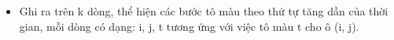 \begin{itemize}
	\item Ghi ra trên k dòng, thể    hiện các bước tô màu theo thứ tự tăng dần của thời    gian, mỗi dòng có dạng: i, j, t tương ứng với việc tô    màu t cho ô (i, j).
\end{itemize}